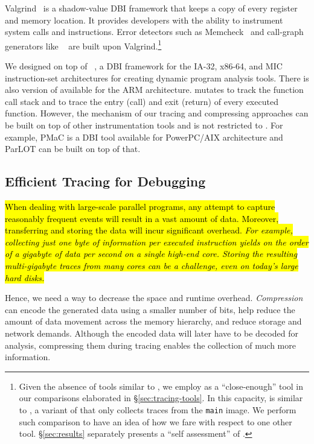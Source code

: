 Valgrind~\cite{valgrind} is a shadow-value DBI framework that keeps a copy of every register and memory location. It provides developers with the ability to instrument system calls and instructions. Error detectors such as Memcheck~\cite{memcheck} and call-graph generators like \callgrind~\cite{callgrind} are built upon Valgrind.\footnote{Given the absence of tools similar to \parlot, we employ \callgrind
 as a ``close-enough'' tool in our comparisons elaborated in \S\ref{sec:tracing-tools}.
 In this capacity, \callgrind is similar to \parlotm, a variant of \parlot that only collects
 traces from the {\tt main} image. We perform such comparison to have an idea of how we fare
 with respect to one other tool. \S\ref{sec:results} separately
 presents a ``self assessment'' of \parlot.}

 
%


We designed \parlot on top of \pin~\cite{pin}, a DBI framework for the IA-32, x86-64, and MIC instruction-set architectures for creating dynamic program analysis tools. There is also version of \pin available for the ARM architecture\cite{pinarm}. \parlot mutates \pin to track the function call stack and to trace the entry (call) and exit (return) of every executed function. However, the mechanism of our tracing and compressing approaches can be built on top of other instrumentation tools and is not restricted to \pin. For example, PMaC \cite{pmac} is a DBI tool available for PowerPC/AIX architecture and ParLOT can be built on top of that.


\subsection{Efficient Tracing for Debugging}
\hl{When dealing with large-scale parallel programs, any attempt to capture reasonably frequent events will result in a vast amount of data. Moreover, transferring and storing the data will incur significant overhead. \textit{For example, collecting just one byte of information per executed instruction yields on the order of a gigabyte of data per second on a single high-end core. Storing the resulting multi-gigabyte traces from many cores can be a challenge, even on today's large hard disks.} }

Hence, we need a way to decrease the space and runtime overhead. \textit{Compression} can encode the generated data using a smaller number of bits, help
reduce the amount of data movement across the memory hierarchy, and
reduce storage and network demands.
%
Although the encoded data will later have to be decoded for analysis, compressing them during tracing enables the collection of much more information.

